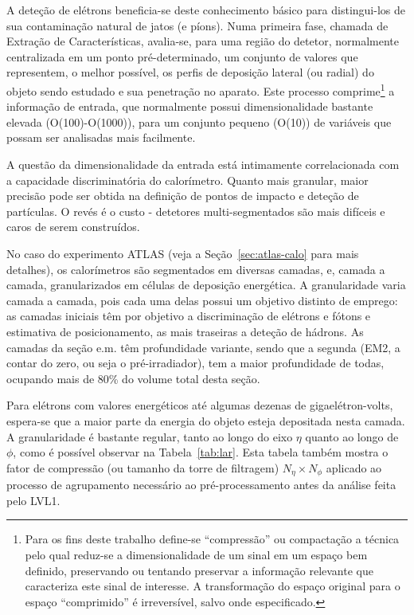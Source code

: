 
A deteção de elétrons beneficia-se deste conhecimento básico para
distingui-los de sua contaminação natural de jatos (e píons). Numa primeira
fase, chamada de Extração de Características, avalia-se, para uma região do
detetor, normalmente centralizada em um ponto pré-determinado, um conjunto de
valores que representem, o melhor possível, os perfis de deposição lateral (ou
radial) do objeto sendo estudado e sua penetração no aparato. Este processo
comprime\footnote{Para os fins deste trabalho define-se ``compressão'' ou
compactação a técnica pelo qual reduz-se a dimensionalidade de um sinal em um
espaço bem definido, preservando ou tentando preservar a informação relevante
que caracteriza este sinal de interesse. A transformação do espaço original
para o espaço ``comprimido'' é irreversível, salvo onde especificado.} a
informação de entrada, que normalmente possui dimensionalidade bastante
elevada (O(100)-O(1000)), para um conjunto pequeno (O(10)) de variáveis que
possam ser analisadas mais facilmente.

A questão da dimensionalidade da entrada está intimamente correlacionada com a
capacidade discriminatória do calorímetro. Quanto mais granular, maior precisão
pode ser obtida na definição de pontos de impacto e deteção de partículas. O
revés é o custo - detetores multi-segmentados são mais difíceis e caros de
serem construídos.

No caso do experimento ATLAS (veja a Seção~\ref{sec:atlas-calo} para mais
detalhes), os calorímetros são segmentados em diversas camadas, e, camada a
camada, granularizados em células de deposição energética. A granularidade
varia camada a camada, pois cada uma delas possui um objetivo distinto de
emprego: as camadas iniciais têm por objetivo a discriminação de elétrons e
fótons e estimativa de posicionamento, as mais traseiras a deteção de
hádrons. As camadas da seção e.m. têm profundidade variante, sendo que a
segunda (EM2, a contar do zero, ou seja o pré-irradiador), tem a maior
profundidade de todas, ocupando mais de 80\% do volume total desta seção.

Para elétrons com valores energéticos até algumas dezenas de
gigaelétron-volts, espera-se que a maior parte da energia do objeto esteja
depositada nesta camada. A granularidade é bastante regular, tanto ao longo do
eixo $\eta$ quanto ao longo de $\phi$, como é possível observar na
Tabela~\ref{tab:lar}. Esta tabela também mostra o fator de compressão (ou
tamanho da torre de filtragem) $N_{\eta} \times N_{\phi}$ aplicado ao processo
de agrupamento necessário ao pré-processamento antes da análise feita pelo
LVL1.

